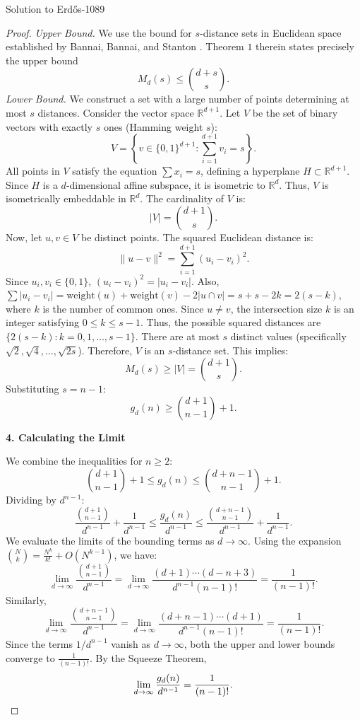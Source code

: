 \documentclass{article}
\theoremstyle{plain}
\theoremstyle{definition}
\begin{document}
\begin{solution}{Solution to Erdős-1089}
\begin{proof}
\textit{Upper Bound.}
We use the bound for $s$-distance sets in Euclidean space established by Bannai, Bannai, and Stanton \cite{BBS83}. Theorem $1$ therein states precisely the upper bound
$$M_d(s) \leq \binom{d+s}{s}.
$$
\textit{Lower Bound.}
We construct a set with a large number of points determining at most $s$ distances.
Consider the vector space $\mathbb{R}^{d+1}$. Let $V$ be the set of binary vectors with exactly $s$ ones (Hamming weight $s$):
\[ V = \left\{ v \in \{0,1\}^{d+1} : \sum_{i=1}^{d+1} v_i = s \right\}. \]
All points in $V$ satisfy the equation $\sum x_i = s$, defining a hyperplane $H \subset \mathbb{R}^{d+1}$. Since $H$ is a $d$-dimensional affine subspace, it is isometric to $\mathbb{R}^d$. Thus, $V$ is isometrically embeddable in $\mathbb{R}^d$.
The cardinality of $V$ is:
\[ |V| = \binom{d+1}{s}. \]
Now, let $u, v \in V$ be distinct points. The squared Euclidean distance is:
\[ \|u-v\|^2 = \sum_{i=1}^{d+1} (u_i - v_i)^2. \]
Since $u_i, v_i \in \{0,1\}$, $(u_i - v_i)^2 = |u_i - v_i|$.
Also, $\sum |u_i - v_i| = \text{weight}(u) + \text{weight}(v) - 2|u \cap v| = s + s - 2k = 2(s-k)$, where $k$ is the number of common ones.
Since $u \ne v$, the intersection size $k$ is an integer satisfying $0 \le k \le s-1$.
Thus, the possible squared distances are $\{ 2(s-k) : k = 0, 1, \dots, s-1 \}$.
There are at most $s$ distinct values (specifically $\sqrt{2}, \sqrt{4}, \dots, \sqrt{2s}$).
Therefore, $V$ is an $s$-distance set.
This implies:
\[ M_d(s) \ge |V| = \binom{d+1}{s}. \]
Substituting $s=n-1$:
\[ g_d(n) \ge \binom{d+1}{n-1} + 1. \]

\textbf{4. Calculating the Limit}

We combine the inequalities for $n \ge 2$:
\[ \binom{d+1}{n-1} + 1 \le g_d(n) \le \binom{d+n-1}{n-1} + 1. \]
Dividing by $d^{n-1}$:
\[ \frac{\binom{d+1}{n-1}}{d^{n-1}} + \frac{1}{d^{n-1}} \le \frac{g_d(n)}{d^{n-1}} \le \frac{\binom{d+n-1}{n-1}}{d^{n-1}} + \frac{1}{d^{n-1}}. \]
We evaluate the limits of the bounding terms as $d \to \infty$.
Using the expansion $\binom{N}{k} = \frac{N^k}{k!} + O(N^{k-1})$, we have:
\[ \lim_{d\to \infty} \frac{\binom{d+1}{n-1}}{d^{n-1}} = \lim_{d\to \infty} \frac{(d+1)\cdots(d-n+3)}{d^{n-1}(n-1)!} = \frac{1}{(n-1)!}. \]
Similarly,
\[ \lim_{d\to \infty} \frac{\binom{d+n-1}{n-1}}{d^{n-1}} = \lim_{d\to \infty} \frac{(d+n-1)\cdots(d+1)}{d^{n-1}(n-1)!} = \frac{1}{(n-1)!}. \]
Since the terms $1/d^{n-1}$ vanish as $d \to \infty$, both the upper and lower bounds converge to $\frac{1}{(n-1)!}$.
By the Squeeze Theorem,
\[ \lim_{d\to \infty}\frac{g_d(n)}{d^{n-1}} = \frac{1}{(n-1)!}. \qedhere \]


\end{proof}
\end{solution}
\end{document}
